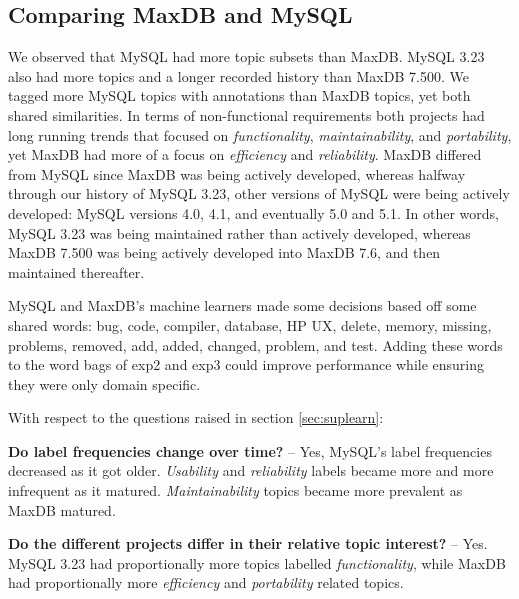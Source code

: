 \documentclass[]{sig-alternate}
\newcommand{\XXX}[1]{\textcolor{red}{{\it \textbf{[XXX: #1]}}}}
\begin{document}
\subsection{Comparing MaxDB and MySQL}

\label{sec:comparison}

We observed that MySQL had more topic subsets than MaxDB. 
MySQL 3.23 also had more topics and a longer recorded history than MaxDB 7.500. 
We tagged more MySQL topics with annotations than MaxDB topics, yet both shared similarities. 
In terms of non-functional requirements both projects had long running trends that focused on \emph{functionality}, \emph{maintainability}, and \emph{portability}, yet MaxDB had more of a focus on \emph{efficiency} and \emph{reliability}. 
MaxDB differed from MySQL since MaxDB was being actively developed, whereas halfway through our history of MySQL 3.23, other versions of MySQL were being actively developed: MySQL versions 4.0, 4.1, and eventually 5.0 and 5.1. 
In other words, MySQL 3.23 was being maintained rather than actively developed, whereas MaxDB 7.500 was being actively developed into MaxDB 7.6, and then maintained thereafter.

MySQL and MaxDB's machine learners made some decisions based off some shared words: \textsf{bug, code, compiler, database, HP UX, delete, memory, missing, problems, removed, add, added, changed, problem, and test}. 
Adding these words to the word bags of \textsf{exp2} and \textsf{exp3} could improve performance while ensuring they were only domain specific.

With respect to the questions raised in section \ref{sec:suplearn}:

\textbf{Do label frequencies change over time?} -- Yes, MySQL's label
frequencies decreased as it got older. \emph{Usability} and \emph{reliability}
labels became more and more infrequent as it matured. \emph{Maintainability} topics
became more prevalent as MaxDB matured.

\textbf{Do the different projects differ in their relative topic
  interest?} -- Yes. MySQL 3.23 had proportionally more
topics labelled \emph{functionality}, while MaxDB had proportionally more
\emph{efficiency} and \emph{portability} related topics.
 

\end{document}
